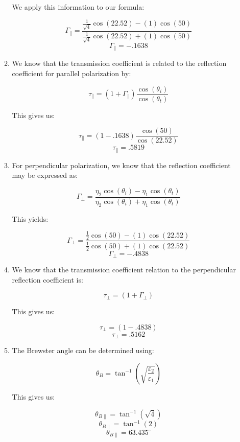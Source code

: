 \begin{enumerate}
\begin{enumerate}
        We apply this information to our formula:

        $$\Gamma_{\parallel}=\frac{\frac{1}{\sqrt{4}}\cos(22.52)-(1)\cos(50)}{\frac{1}{\sqrt{4}}\cos(22.52)+(1)\cos(50)}$$
        $$\boxed{\Gamma_{\parallel}=-.1638}$$


      \item 

        We know that the transmission coefficient is related to the reflection coefficient for parallel polarization by:

        $$\tau_{\parallel}=(1+\Gamma_{\parallel})\frac{\cos(\theta_i)}{\cos(\theta_t)}$$

        This gives us:

        $$\tau_{\parallel}=(1-.1638)\frac{\cos(50)}{\cos(22.52)}$$
        $$\boxed{\tau_{\parallel}=.5819}$$

      \item 

        For perpendicular polarization, we know that the reflection coefficient may be expressed as:

        $$\Gamma_{\perp}=\frac{\eta_2\cos(\theta_i)-\eta_1\cos(\theta_t)}{\eta_2\cos(\theta_i)+\eta_1\cos(\theta_t)}$$

        This yields:

        $$\Gamma_{\perp}=\frac{\frac{1}{2}\cos(50)-(1)\cos(22.52)}{\frac{1}{2}\cos(50)+(1)\cos(22.52)}$$
        $$\boxed{\Gamma_{\perp}=-.4838}$$

      \item 

        We know that the transmission coefficient relation to the perpendicular reflection coefficient is:

        $$\tau_{\perp}=(1+\Gamma_{\perp})$$

        This gives us:

        $$\tau_{\perp}=(1-.4838)$$
        $$\boxed{\tau_{\perp}=.5162}$$

      \item 

        The Brewster angle can be determined using:

        $$\theta_B=\tan^{-1}\left( \sqrt{\frac{\varepsilon_2}{\varepsilon_1}} \right)$$

        This gives us:

        $$\theta_{B\parallel}=\tan^{-1}\left( \sqrt{4} \right)$$
        $$\theta_{B\parallel}=\tan^{-1}\left( 2\right)$$
        $$\boxed{\theta_{B\parallel}=63.435^{\circ}}$$


\end{enumerate}
\end{enumerate}
